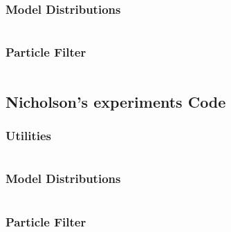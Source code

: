\documentclass[12pt]{article}
\begin{document}
\begin{appendices}
	\subsubsection{Model Distributions}
	\inputminted[fontsize=\small, linenos, frame=lines,
	framesep=2mm, baselinestretch=1]{python}{/home/raphael/dissertation/bootstrap/ricker_gamma.py}
	\clearpage
	\subsubsection{Particle Filter}
	\inputminted[fontsize=\small, linenos, frame=lines,
	framesep=2mm, baselinestretch=1]{python}{/home/raphael/dissertation/bootstrap/filter.py}
	\clearpage
	\subsection{Nicholson's experiments Code}
	\subsubsection{Utilities}
	\inputminted[fontsize=\small, linenos, frame=lines,
	framesep=2mm, baselinestretch=1]{cython}{/home/raphael/dissertation/bootstrap/utils_blowflies.pyx}
	\clearpage
	\subsubsection{Model Distributions}
	\inputminted[fontsize=\small, linenos, frame=lines,
	framesep=2mm, baselinestretch=1]{python}{/home/raphael/dissertation/bootstrap/blowflies.py}
	\clearpage
	\subsubsection{Particle Filter}
	\inputminted[fontsize=\small, linenos, frame=lines,
	framesep=2mm, baselinestretch=1]{python}{/home/raphael/dissertation/bootstrap/abc.py}
	\end{appendices}
	
\end{document}
